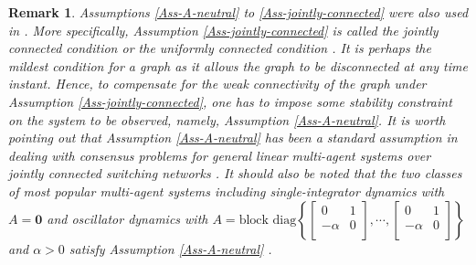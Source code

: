 \documentclass[twocolumn]{autart}
\newtheorem{Remark}{Remark}
\begin{document}
\begin{Remark}
Assumptions \ref{Ass-A-neutral} to \ref{Ass-jointly-connected} were also used in \cite{ZhangLu21ACC}.
More specifically, Assumption \ref{Ass-jointly-connected} is called the jointly connected condition \citep{Jadbabaie03, SuHuang12Full}
or the uniformly connected condition \citep{Lin06}.
It is perhaps the mildest condition for a graph as it allows the graph to be disconnected at any time instant.
Hence, to compensate for the weak connectivity of the graph under Assumption \ref{Ass-jointly-connected},
one has to impose some stability constraint on the system to be observed, namely, Assumption \ref{Ass-A-neutral}.
It is worth pointing out that Assumption \ref{Ass-A-neutral} has been a standard assumption
in dealing with consensus problems for general linear multi-agent systems over jointly connected switching networks \citep{SuHuang12Full}.
It should also be noted that the two classes of most popular multi-agent systems
including single-integrator dynamics with $A=\mathbf{0}$ and oscillator dynamics
with $A =\text{block diag}\left\{\left[
                                   \begin{array}{cc}
                                     0 & 1 \\
                                     -\alpha & 0 \\
                                   \end{array}
                                 \right],\cdots, \left[
                                   \begin{array}{cc}
                                     0 & 1 \\
                                     -\alpha & 0 \\
                                   \end{array}
                                 \right] \right\}$
and $\alpha>0$ satisfy Assumption \ref{Ass-A-neutral}
\citep{Olfati-Saber04, Ren08}.
\end{Remark}
\end{document}
